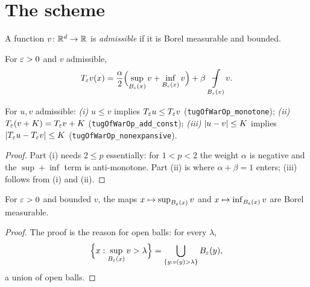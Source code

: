 \chapter{The scheme}

\begin{definition}\label{def:bddmeas}
\leanok
A function $v \colon \mathbb{R}^d \to \mathbb{R}$ is \emph{admissible} if it is Borel
measurable and bounded.
\end{definition}


\begin{definition}\label{def:op}
\leanok
{}
For $\varepsilon > 0$ and $v$ admissible,
\begin{equation}
  \Op v(x) = \frac{\alpha}{2}\Bigl(\sup_{B_\eps(x)} v + \inf_{B_\eps(x)} v\Bigr)
    + \beta \avgint_{B_\eps(x)} v .
\end{equation}
\end{definition}


\begin{theorem}\label{thm:one}
\leanok
{}
For $u,v$ admissible:
\emph{(i)} $u \le v$ implies $T_\varepsilon u \le T_\varepsilon v$
(\texttt{tugOfWarOp\_monotone});
\emph{(ii)} $T_\varepsilon(v+K) = T_\varepsilon v + K$ (\texttt{tugOfWarOp\_add\_const});
\emph{(iii)} $\left\lvert u-v\right\rvert \le K$ implies $\left\lvert T_\varepsilon u - T_\varepsilon v\right\rvert \le K$
(\texttt{tugOfWarOp\_nonexpansive}).
\end{theorem}

\begin{proof}
\leanok
Part (i) needs $2 \le p$ essentially: for $1<p<2$ the weight $\alpha$ is
negative and the $\sup+\inf$ term is anti-monotone. Part (ii) is where $\alpha+\beta=1$ enters;
(iii) follows from (i) and (ii).
\end{proof}


\begin{theorem}\label{thm:meas}
\leanok
{}
For $\varepsilon>0$ and bounded $v$, the maps $x \mapsto \sup_{B_\varepsilon(x)} v$ and
$x \mapsto \inf_{B_\varepsilon(x)} v$ are Borel measurable.
\end{theorem}

\begin{proof}
\leanok
The proof is the reason for open balls: for every $\lambda$,
\begin{equation}
  \Bigl\{x : \sup_{B_\varepsilon(x)} v > \lambda\Bigr\}
  = \bigcup_{\{y : v(y) > \lambda\}} B_\varepsilon(y),
\end{equation}
a union of open balls.
\end{proof}



